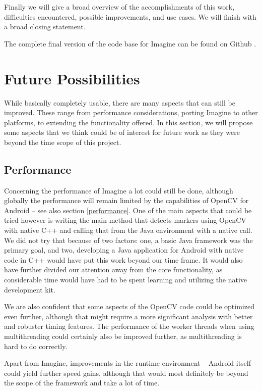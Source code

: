 \label{conclusion}

Finally we will give a broad overview of the accomplishments of this work, difficulties encountered, possible improvements, and use cases.
We will finish with a broad closing statement.

The complete final version of the code base for Imagine can be found on Github \cite{github}.

\section{Future Possibilities}
\label{future}

While basically completely usable, there are many aspects that can still be improved.
These range from performance considerations, porting Imagine to other platforms, to extending the functionality offered.
In this section, we will propose some aspects that we think could be of interest for future work as they were beyond the time scope of this project.

\subsection{Performance}

Concerning the performance of Imagine a lot could still be done, although globally the performance will remain limited by the capabilities of OpenCV for Android – see also section \ref{performance}.
One of the main aspects that could be tried however is writing the main method that detects markers using OpenCV with native C++ and calling that from the Java environment with a native call.
We did not try that because of two factors: one, a basic Java framework was the primary goal, and two, developing a Java application for Android with native code in C++ would have put this work beyond our time frame.
It would also have further divided our attention away from the core functionality, as considerable time would have had to be spent learning and utilizing the native development kit.

We are also confident that some aspects of the OpenCV code could be optimized even further, although that might require a more significant analysis with better and robuster timing features.
The performance of the worker threads when using multithreading could certainly also be improved further, as multithreading is hard to do correctly.

Apart from Imagine, improvements in the runtime environment – Android itself – could yield further speed gains, although that would most definitely be beyond the scope of the framework and take a lot of time.

